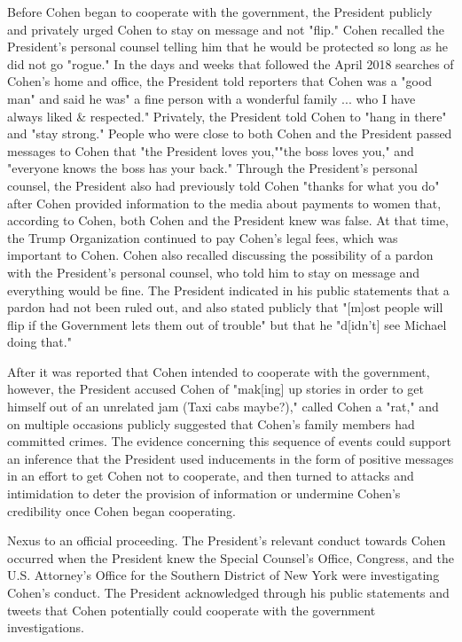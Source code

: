 Before Cohen began to cooperate with the government, the President publicly and privately urged Cohen to stay on message and not "flip." Cohen recalled the President's personal counsel telling him that he would be protected so long as he did not go "rogue."
In the days and weeks that followed the April 2018 searches of Cohen's home and office, the President told reporters that Cohen was a "good man" and said he was" a fine person with a wonderful family ... who I have always liked \& respected."
Privately, the President told Cohen to "hang in there" and "stay strong." People who were close to both Cohen and the President passed messages to Cohen that "the President loves you,""the boss loves you," and "everyone knows the boss has your back."
Through the President's personal counsel, the President also had previously told Cohen "thanks for what you do" after Cohen provided information to the media about payments to women that, according to Cohen, both Cohen and the President knew was false.
At that time, the Trump Organization continued to pay Cohen's legal fees, which was important to Cohen.
Cohen also recalled discussing the possibility of a pardon with the President's personal counsel, who told him to stay on message and everything would be fine.
The President indicated in his public statements that a pardon had not been ruled out, and also stated publicly that "[m]ost people will flip if the Government lets them out of trouble" but that he "d[idn't] see Michael doing that."

After it was reported that Cohen intended to cooperate with the government, however, the President accused Cohen of "mak[ing] up stories in order to get himself out of an unrelated jam (Taxi cabs maybe?)," called Cohen a "rat," and on multiple occasions publicly suggested that Cohen's family members had committed crimes.
The evidence concerning this sequence of events could support an inference that the President used inducements in the form of positive messages in an effort to get Cohen not to cooperate, and then turned to attacks and intimidation to deter the provision of information or undermine Cohen's credibility once Cohen began cooperating.

Nexus to an official proceeding.
The President's relevant conduct towards Cohen occurred when the President knew the Special Counsel's Office, Congress, and the U.S. Attorney's Office for the Southern District of New York were investigating Cohen's conduct.
The President acknowledged through his public statements and tweets that Cohen potentially could cooperate with the government investigations.

